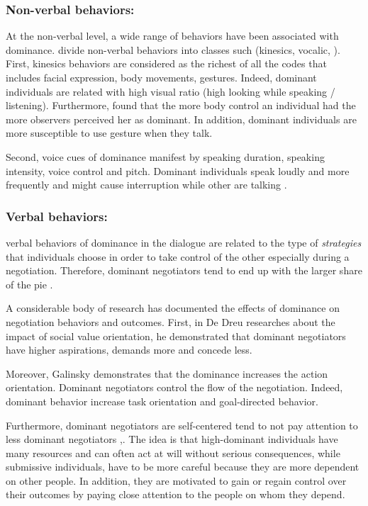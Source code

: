 \documentclass{llncs}
\begin{document}
					\subsubsection{Non-verbal behaviors:}
					At the non-verbal level, a wide range of behaviors have been associated with dominance. \cite{burgoonnonverbal} divide non-verbal behaviors into classes such (kinesics, vocalic, ). First, kinesics behaviors are considered as the richest of all the codes that includes facial expression, body movements, gestures. Indeed, dominant individuals are related with high visual ratio (high looking while speaking / listening).  Furthermore, \cite{burgoonnonverbal} found that the more body control an individual had the more observers perceived her as dominant. In addition, dominant individuals are more susceptible to use gesture when they talk.  
					\par  Second, voice cues of dominance manifest by speaking duration, speaking intensity, voice control and pitch. Dominant individuals speak loudly and more frequently and might cause interruption while other are talking \cite{dunbar2005perceptions}.
					
					\subsubsection{Verbal behaviors:}
					verbal behaviors of dominance in the dialogue are related to the type of \textit{strategies} that individuals choose in order to take control of the other especially during a negotiation. Therefore, dominant negotiators tend to end up with the larger share of the pie \cite{giebels2000interdependence}. 
					\par A considerable body of research has documented the effects of dominance on negotiation behaviors and outcomes. First, in De Dreu researches about the impact of social value orientation, he demonstrated that \cite{de1995impact} dominant negotiators have higher aspirations, demands more and concede less. 
					
					 Moreover, Galinsky \cite{galinsky2003power} demonstrates that the dominance increases the action orientation. Dominant negotiators control the flow of the negotiation. Indeed, dominant behavior increase task orientation and goal-directed behavior. 
					 
					 Furthermore, dominant negotiators are self-centered tend to not pay attention to less dominant negotiators \cite{fiske1993controlling},\cite{de1995impact}.
					 The idea is that high-dominant individuals have many resources and can often act at will without serious consequences, while submissive individuals, have to be more careful because they are more dependent on other people. In addition, they are motivated to gain or regain control over their outcomes by paying close attention to the people on whom they depend.
					
\end{document}
